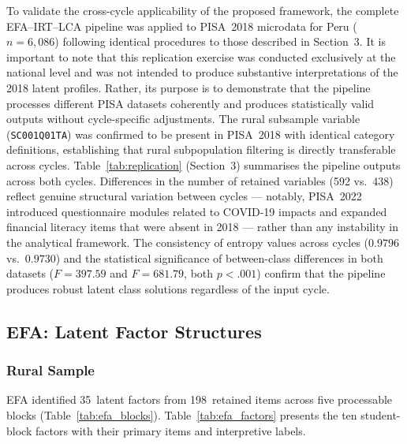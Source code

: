 \documentclass[twocolumn,12pt]{article}
\begin{document}
To validate the cross-cycle applicability of the proposed
framework, the complete EFA--IRT--LCA pipeline was applied to
PISA~2018 microdata for Peru (\(n = 6{,}086\)) following
identical procedures to those described in Section~3. It is
important to note that this replication exercise was conducted
exclusively at the national level and was not intended to
produce substantive interpretations of the 2018 latent profiles.
Rather, its purpose is to demonstrate that the pipeline
processes different PISA datasets coherently and produces
statistically valid outputs without cycle-specific adjustments.
The rural subsample variable (\texttt{SC001Q01TA}) was confirmed
to be present in PISA~2018 with identical category definitions,
establishing that rural subpopulation filtering is directly
transferable across cycles. Table~\ref{tab:replication} (Section~3)
summarises the pipeline outputs across both cycles. Differences
in the number of retained variables (592 vs.\ 438) reflect
genuine structural variation between cycles --- notably,
PISA~2022 introduced questionnaire modules related to COVID-19
impacts and expanded financial literacy items that were absent
in 2018 --- rather than any instability in the analytical
framework. The consistency of entropy values across cycles
($0.9796$ vs.\ $0.9730$) and the statistical significance of
between-class differences in both datasets ($F = 397.59$ and
$F = 681.79$, both $p < .001$) confirm that the pipeline
produces robust latent class solutions regardless of the input
cycle.

\subsection{EFA: Latent Factor Structures}

\subsubsection{Rural Sample}

EFA identified 35~latent factors from 198~retained items across five
processable blocks (Table~\ref{tab:efa_blocks}). Table~\ref{tab:efa_factors}
presents the ten student-block factors with their primary items and
interpretive labels.
\end{document}
